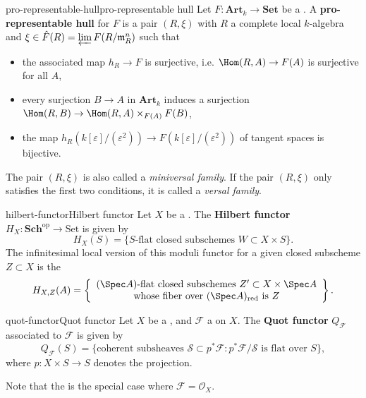 \begin{topic}{pro-representable-hull}{pro-representable hull}
    Let $F : \textbf{Art}_k \to \textbf{Set}$ be a .
    A \textbf{pro-representable hull} for $F$ is a pair $(R, \xi)$ with $R$ a complete local $k$-algebra and $\xi \in \hat{F}(R) = \varprojlim F(R / \mathfrak{m}_R^n)$ such that
    \begin{itemize}
        \item the associated map $h_R \to F$ is surjective, i.e. $\Hom(R, A) \to F(A)$ is surjective for all $A$,
        \item every surjection $B \to A$ in $\textbf{Art}_k$ induces a surjection $\Hom(R, B) \to \Hom(R, A) \times_{F(A)} F(B)$,
        \item the map $h_R(k[\varepsilon]/(\varepsilon^2)) \to F(k[\varepsilon]/(\varepsilon^2))$ of tangent spaces is bijective.
    \end{itemize}
    The pair $(R, \xi)$ is also called a \textit{miniversal family}. If the pair $(R, \xi)$ only satisfies the first two conditions, it is called a \textit{versal family}.
\end{topic}

\begin{topic}{hilbert-functor}{Hilbert functor}
    Let $X$ be a . The \textbf{Hilbert functor} $H_X : \textbf{Sch}^\text{op} \to \text{Set}$ is given by
    \[ H_X(S) = \{ \text{$S$-flat closed subschemes $W \subset X \times S$} \} . \]
    The infinitesimal local version of this moduli functor for a given closed subscheme $Z \subset X$ is the 
    \[ H_{X, Z}(A) = \left\{ \begin{array}{cc} \text{$(\Spec A)$-flat closed subschemes $Z' \subset X \times \Spec A$} \\ \text{whose fiber over $(\Spec A)_\text{red}$ is $Z$} \end{array} \right\} . \]
\end{topic}

\begin{topic}{quot-functor}{Quot functor}
    Let $X$ be a , and $\mathcal{F}$ a  on $X$. The \textbf{Quot functor} $Q_\mathcal{F}$ associated to $\mathcal{F}$ is given by
    \[ Q_\mathcal{F}(S) = \{ \text{coherent subsheaves } \mathcal{S} \subset p^* \mathcal{F} : p^* \mathcal{F} / \mathcal{S} \text{ is flat over } S \} , \]
    where $p : X \times S \to S$ denotes the projection.
    
    Note that the  is the special case where $\mathcal{F} = \mathcal{O}_X$.
\end{topic}
